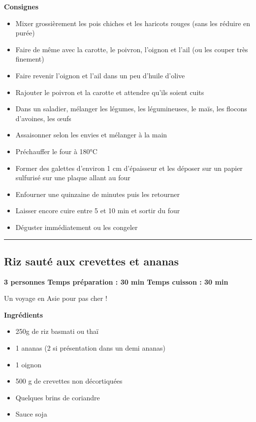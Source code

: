 \documentclass[]{book}
\providecommand{\tightlist}{%
  \setlength{\itemsep}{0pt}\setlength{\parskip}{0pt}}
\begin{document}
\textbf{Consignes}

\begin{itemize}
\tightlist
\item
  Mixer grossièrement les pois chiches et les haricots rouges (sans les réduire en purée)
\item
  Faire de même avec la carotte, le poivron, l'oignon et l'ail (ou les couper très finement)
\item
  Faire revenir l'oignon et l'ail dans un peu d'huile d'olive
\item
  Rajouter le poivron et la carotte et attendre qu'ils soient cuits
\item
  Dans un saladier, mélanger les légumes, les légumineuses, le maïs, les flocons d'avoines, les œufs
\item
  Assaisonner selon les envies et mélanger à la main
\item
  Préchauffer le four à 180°C
\item
  Former des galettes d'environ 1 cm d'épaisseur et les déposer sur un papier sulfurisé sur une plaque allant au four
\item
  Enfourner une quinzaine de minutes puis les retourner
\item
  Laisser encore cuire entre 5 et 10 min et sortir du four
\item
  Déguster immédiatement ou les congeler
\end{itemize}

\begin{center}\rule{0.5\linewidth}{0.5pt}\end{center}

\hypertarget{riz-sautuxe9-aux-crevettes-et-ananas}{%
\subsection*{\texorpdfstring{{Riz sauté aux crevettes et ananas}}{Riz sauté aux crevettes et ananas}}\label{riz-sautuxe9-aux-crevettes-et-ananas}}

\begin{salebox}
\textbf{3 personnes \textbar{} Temps préparation : 30 min \textbar{}
Temps cuisson : 30 min}

Un voyage en Asie pour pas cher !
\end{salebox}

\textbf{Ingrédients}

\begin{itemize}
\tightlist
\item
  250g de riz basmati ou thaï
\item
  1 ananas (2 si présentation dans un demi ananas)
\item
  1 oignon
\item
  500 g de crevettes non décortiquées
\item
  Quelques brins de coriandre
\item
  Sauce soja
\end{itemize}
\end{document}
